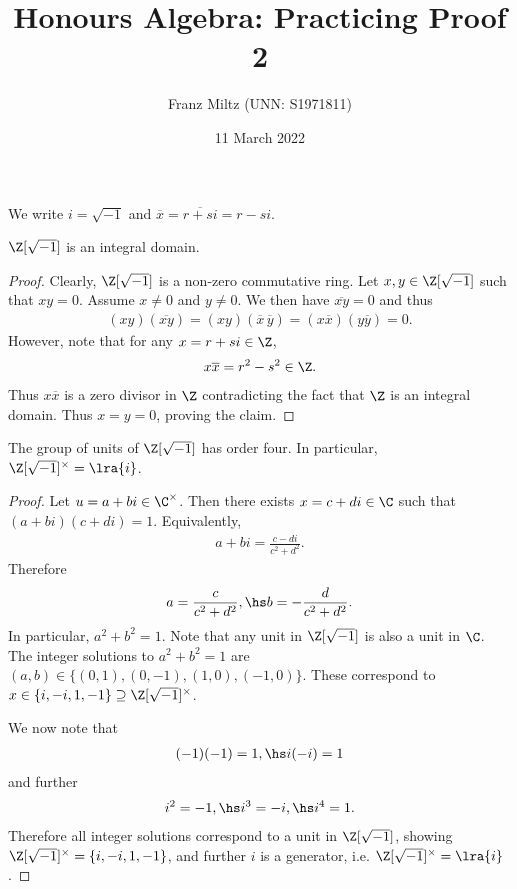 \documentclass{article}
\begin{document}
\title{Honours Algebra: Practicing Proof 2}
\author{Franz Miltz (UNN: S1971811)}
\date{11 March 2022}
\maketitle
\newcommand{\gaussint}{\Z[\sqrt{-1}]}
We write $i=\sqrt{-1}$ and $\overline x = \overline{r+si} = r - si$.
\begin{claim*}[1]
   $\Z[\sqrt{-1}]$ is an integral domain.
   \begin{proof}
      Clearly, $\gaussint$ is a non-zero commutative ring. Let $x,y\in\gaussint$ such that 
      $xy=0$. Assume $x\not=0$ and $y\not=0$. We then have $\overline{xy}=0$ and thus 
      \begin{align*}
         (xy)(\overline{xy})=(xy)(\overline x\,\overline y)=(x\overline x)(y\overline y) = 0.
      \end{align*}
      However, note that for any $x=r+si\in\Z$, 
      \begin{align*}
         x\overline x = r^2-s^2 \in\Z.
      \end{align*}
      Thus $x\overline x$ is a zero divisor in $\Z$ contradicting the fact that $\Z$ is an 
      integral domain. Thus $x=y=0$, proving the claim.
   \end{proof}
\end{claim*}

\begin{claim*}[2]
   The group of units of $\gaussint$ has order four. In particular, $\gaussint^\times = \lra{i}$.
   \begin{proof}
      Let $u=a+bi\in\C^\times$. Then there exists $x=c+di\in\C$ such that $(a+bi)(c+di) = 1$.
      Equivalently,
      \begin{align*}
         a+bi = \frac{c-di}{c^2+d^2}.
      \end{align*}
      Therefore 
      \begin{align*}
         a = \frac{c}{c^2+d^2},\hs b=-\frac{d}{c^2+d^2}.
      \end{align*}
      In particular, $a^2+b^2=1$. Note that any unit in $\gaussint$ is also a unit in $\C$. 
      The integer solutions to $a^2+b^2=1$ are $(a,b)\in\{(0,1),(0,-1),(1,0),(-1,0)\}$.
      These correspond to $x\in\{i,-i,1,-1\}\supseteq\gaussint^\times$.

      We now note that 
      \begin{align*}
         (-1)(-1) = 1,\hs i(-i) = 1
      \end{align*}
      and further
      \begin{align*}
         i^2 = -1,\hs i^3 = -i, \hs i^4 = 1.
      \end{align*}
      Therefore all integer solutions correspond to a unit in $\gaussint$, showing 
      $\gaussint^\times=\{i,-i,1,-1\}$, and further $i$ is a generator, i.e. $\gaussint^\times=\lra{i}$.
   \end{proof}
\end{claim*}
\end{document}
